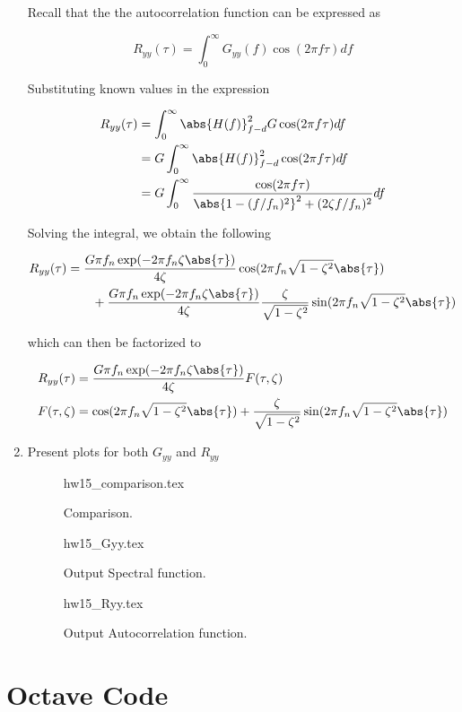 \documentclass[a4paper,12pt]{article}
\begin{document}
\begin{enumerate}
Recall that the the autocorrelation function can be expressed as

\begin{equation*}
 R_{yy}(\tau) = \int_0^\infty G_{yy} (f) \cos(2 \pi f \tau) df
\end{equation*}

Substituting known values in the expression

\begin{align*}
 R_{yy}(\tau) &= \int_0^\infty \abs{H(f)}_{f-d}^2 G \cos(2 \pi f \tau) df \\
 &= G \int_0^\infty \abs{H(f)}_{f-d}^2 \cos(2 \pi f \tau) df \\
 &= G \int_0^\infty
 \frac{\cos(2 \pi f \tau)  }{\abs{1-(f/f_n)^2}^2 + (2 \zeta f/f_n)^2 }
 df
\end{align*}

Solving the integral, we obtain the following

\begin{align*}
 R_{yy}(\tau) &= \frac{G \pi f_n \exp(-2\pi f_n \zeta \abs{\tau})}{4 \zeta}
 \cos(2 \pi f_n \sqrt{1-\zeta^2} \abs{\tau}) \\
 & \qquad + \frac{G \pi f_n \exp(-2\pi f_n \zeta \abs{\tau})}{4 \zeta}
 \frac{\zeta}{\sqrt{1-\zeta^2}}
 \sin(2 \pi f_n \sqrt{1-\zeta^2} \abs{\tau})
\end{align*}

which can then be factorized to

\begin{align*}
  R_{yy}(\tau) &= \frac{G \pi f_n \exp(-2\pi f_n \zeta \abs{\tau})}{4 \zeta} F(\tau, \zeta) \\
 F(\tau, \zeta) &=
  \cos(2 \pi f_n \sqrt{1-\zeta^2} \abs{\tau})
 +
 \frac{\zeta}{\sqrt{1-\zeta^2}}
 \sin(2 \pi f_n \sqrt{1-\zeta^2} \abs{\tau})
\end{align*}

\newpage

\item Present plots for both $G_{yy}$ and $R_{yy}$

\begin{figure}[htb!]
\centering
{hw15_comparison.tex}
\caption{Comparison.}
\label{fig: comparison}
\end{figure}

\begin{figure}[htb!]
\centering
{hw15_Gyy.tex}
\caption{Output Spectral function.}
\label{fig: gyy}
\end{figure}


\begin{figure}[htb!]
\centering
{hw15_Ryy.tex}
\caption{Output Autocorrelation function.}
\label{fig: ryy}
\end{figure}

\end{enumerate}


\newpage
\pagebreak

\printbibliography

\newpage
\pagebreak
\appendix
\section{Octave Code}

\end{document}
